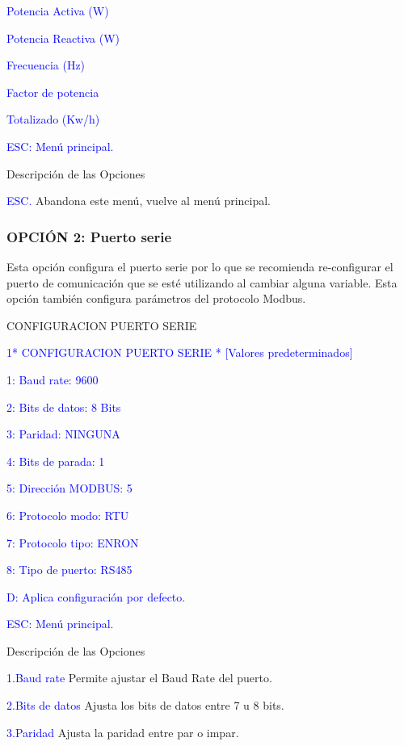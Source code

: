 \textcolor{blue}{Potencia Activa (W)}

\textcolor{blue}{Potencia Reactiva (W)}

\textcolor{blue}{Frecuencia (Hz)}

\textcolor{blue}{Factor de potencia}

\textcolor{blue}{Totalizado (Kw/h)}

\textcolor{blue}{ESC: Menú principal.}



Descripción de las Opciones

\textcolor{blue}{ESC.}
Abandona este menú, vuelve al menú principal.

\subsubsection{OPCIÓN 2: Puerto serie}

Esta opción configura el puerto serie por lo que se recomienda re-configurar el puerto de comunicación que se esté utilizando al cambiar alguna variable. Esta opción también configura parámetros del protocolo Modbus.

\textcolor{mygreen}{CONFIGURACION PUERTO SERIE}

\textcolor{blue}{1* CONFIGURACION PUERTO SERIE * [Valores predeterminados]}

\textcolor{blue}{1: Baud rate: 9600}

\textcolor{blue}{2: Bits de datos: 8 Bits}

\textcolor{blue}{3: Paridad: NINGUNA}

\textcolor{blue}{4: Bits de parada: 1}

\textcolor{blue}{5: Dirección MODBUS: 5}

\textcolor{blue}{6: Protocolo modo: RTU}

\textcolor{blue}{7: Protocolo tipo: ENRON}

\textcolor{blue}{8: Tipo de puerto: RS485}

\textcolor{blue}{D: Aplica configuración por defecto.}

\textcolor{blue}{ESC: Menú principal.}



Descripción de las Opciones

\textcolor{blue}{1.Baud rate }	
Permite ajustar el Baud Rate del puerto.

\textcolor{blue}{2.Bits de datos}
Ajusta los bits de datos entre 7 u 8 bits.

\textcolor{blue}{3.Paridad}
Ajusta la paridad entre par o impar.

